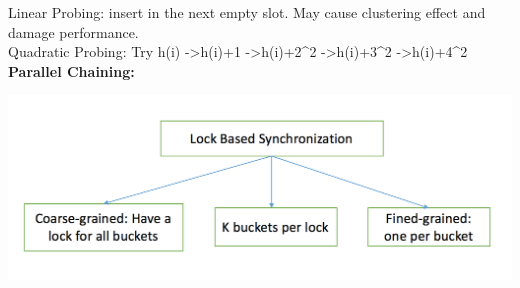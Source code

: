 \documentclass[twoside]{article}
\begin{document}
	Linear Probing: insert in the next empty slot. May cause clustering effect and damage performance. \\
	Quadratic Probing: Try h(i) -\textgreater h(i)+1 -\textgreater h(i)+2^2 -\textgreater h(i)+3^2 -\textgreater h(i)+4^2 \\
	
	\textbf{Parallel Chaining:}
	\begin{center}
		\includegraphics[scale=0.7]{parallelHashing.png}
	\end{center}
	
\end{document}
